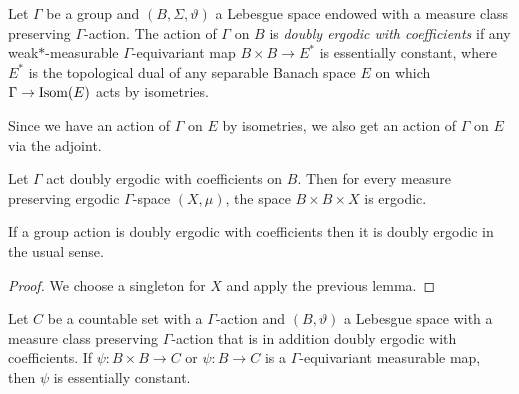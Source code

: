 \begin{defin}
  Let \(\Gamma\) be a group and \((B, \Sigma, \vartheta)\) a Lebesgue space endowed with a measure class preserving \(\Gamma\)-action. The action of \(\Gamma\) on \(B\) is \emph{doubly ergodic with coefficients} if any weak\(\ast\)-measurable \(\Gamma\)-equivariant map \(B \times B \to E^\ast\) is essentially constant, where \(E^\ast\) is the topological dual of any separable Banach space \(E\) on which \(\Gamma \to \operatorname{Isom}(E)\) acts by isometries.
\end{defin}

\begin{rem}
  Since we have an action of \(\Gamma\) on \(E\) by isometries, we also get an action of \(\Gamma\) on \(E\) via the adjoint.
\end{rem}

\begin{lemma}
  \label{lem:coeff-product}
  Let \(\Gamma\) act doubly ergodic with coefficients on \(B\). Then for every measure preserving ergodic \(\Gamma\)-space \((X, \mu)\), the space \(B \times B \times X\) is ergodic.
\end{lemma}

\begin{cor}
  \label{cor:coeff-ergodic}
  If a group action is doubly ergodic with coefficients then it is doubly ergodic in the usual sense.
\end{cor}

\begin{proof}
  We choose a singleton for \(X\) and apply the previous lemma.
\end{proof}

\begin{lemma}[{\cite[Lemma~4.4]{MR3509968}}]
  \label{lem:4.4}
  Let \(C\) be a countable set with a \(\Gamma\)-action and \((B, \vartheta)\) a Lebesgue space with a measure class preserving \(\Gamma\)-action that is in addition doubly ergodic with coefficients. If \(\psi \colon B \times B \to C\) or \(\psi \colon B \to C\) is a \(\Gamma\)-equivariant measurable map, then \(\psi\) is essentially constant.
\end{lemma}

